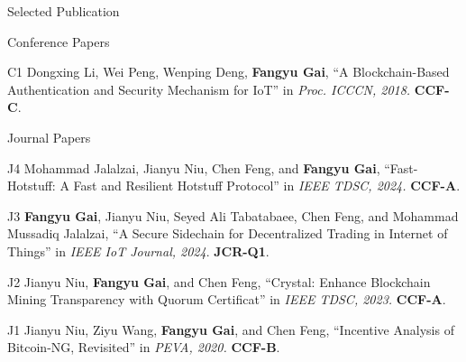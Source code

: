 \documentclass{resume} %
\begin{document}
\begin{rSection}{Selected Publication}
\begin{rSubsection}{Conference Papers}{}{}{}
\item [C1] Dongxing Li, Wei Peng, Wenping Deng, \textbf{Fangyu Gai}, ``A Blockchain-Based Authentication and Security Mechanism for IoT'' in \textit{Proc. ICCCN, 2018.}
\textbf{CCF-C}.

\end{rSubsection}

\begin{rSubsection}{Journal Papers}{}{}{}
\item [J4] Mohammad Jalalzai, Jianyu Niu, Chen Feng, and \textbf{Fangyu Gai}, ``Fast-Hotstuff: A Fast and Resilient Hotstuff Protocol'' in \textit{IEEE TDSC, 2024.}
\textbf{CCF-A}.

\item [J3] \textbf{Fangyu Gai}, Jianyu Niu, Seyed Ali Tabatabaee, Chen Feng, and Mohammad Mussadiq Jalalzai, ``A Secure Sidechain for Decentralized Trading in Internet of Things'' in \textit{IEEE IoT Journal, 2024}.
\textbf{JCR-Q1}.

\item [J2] Jianyu Niu, \textbf{Fangyu Gai}, and Chen Feng, ``Crystal: Enhance Blockchain Mining Transparency with Quorum Certificat'' in \textit{IEEE TDSC, 2023.}
\textbf{CCF-A}.

\item [J1] Jianyu Niu, Ziyu Wang, \textbf{Fangyu Gai}, and Chen Feng, ``Incentive Analysis of Bitcoin-NG, Revisited'' in \textit{PEVA, 2020.}
\textbf{CCF-B}.

\end{rSubsection}



\end{rSection}





\end{document}

